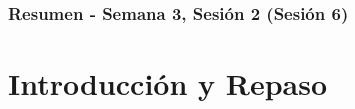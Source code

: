 \documentclass[10pt]{beamer}
\begin{document}
\myfront{}

\begin{frame}
  \titlepage
\end{frame}

\begin{frame}
  \frametitle{Resumen - Semana 3, Sesión 2 (Sesión 6)}
  \tableofcontents
\end{frame}


\section{Introducción y Repaso}
\end{document}
